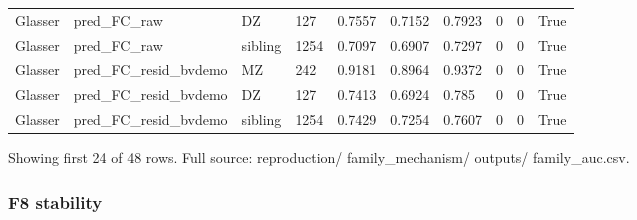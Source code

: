 {\begin{longtable}[]{@{}llllllllll@{}}
Glasser & pred\_FC\_raw & DZ & 127 & 0.7557 & 0.7152 & 0.7923 & 0 & 0 & True \\
Glasser & pred\_FC\_raw & sibling & 1254 & 0.7097 & 0.6907 & 0.7297 & 0 & 0 & True \\
Glasser & pred\_FC\_resid\_bvdemo & MZ & 242 & 0.9181 & 0.8964 & 0.9372 & 0 & 0 & True \\
Glasser & pred\_FC\_resid\_bvdemo & DZ & 127 & 0.7413 & 0.6924 & 0.785 & 0 & 0 & True \\
Glasser & pred\_FC\_resid\_bvdemo & sibling & 1254 & 0.7429 & 0.7254 & 0.7607 & 0 & 0 & True \\
\end{longtable}
}

Showing first 24 of 48 rows. Full source: reproduction/ family\_mechanism/ outputs/ family\_auc.csv.

\subsubsection{F8 stability}\label{f8-stability}

